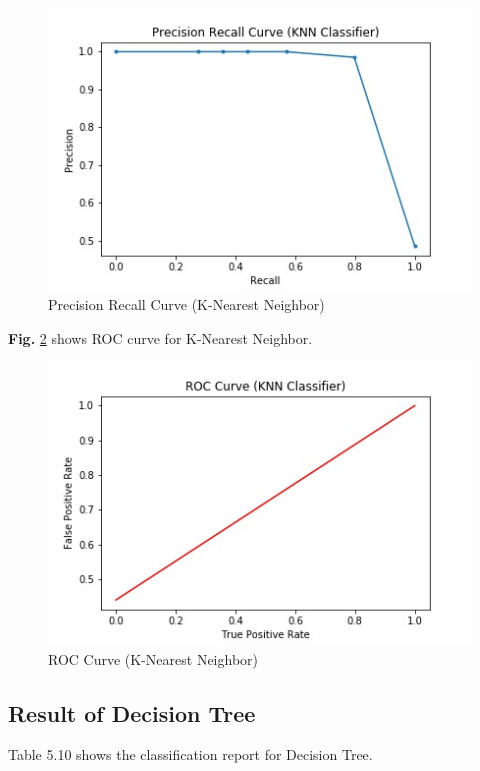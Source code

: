 \documentclass[12pt,a4paper]{report}
\begin{document}
\begin{figure}[h!]
    \centering
    \includegraphics[scale=0.58]{Figures/PRKNN.jpg}
    \caption{Precision Recall Curve (K-Nearest Neighbor)}
    \label{fig:prknn}
\end{figure}

\noindent
\textbf{Fig.} \ref{fig:rocknn} shows ROC curve for K-Nearest Neighbor.

\begin{figure}[h!]
    \centering
    \includegraphics[scale=0.58]{Figures/ROCKNN.jpg}
    \caption{ROC Curve (K-Nearest Neighbor)}
    \label{fig:rocknn}
\end{figure}

\subsection{Result of Decision Tree}
Table 5.10 shows the classification report for Decision Tree.
\end{document}
